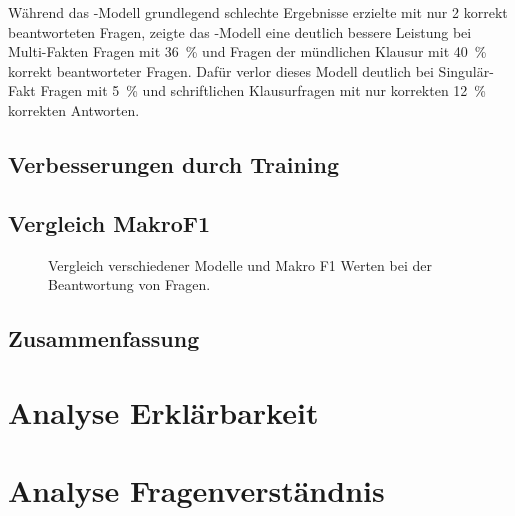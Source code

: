 Während das \liv-Modell grundlegend schlechte Ergebnisse erzielte mit nur 2 korrekt beantworteten Fragen, zeigte das \lia-Modell eine deutlich bessere Leistung bei Multi-Fakten Fragen mit \SI{36}{\percent} und Fragen der mündlichen Klausur mit \SI{40}{\percent} korrekt beantworteter Fragen. Dafür verlor dieses Modell deutlich bei Singulär-Fakt Fragen mit \SI{5}{\percent} und schriftlichen Klausurfragen mit nur korrekten \SI{12}{\percent} korrekten Antworten.\\



\subsection{Verbesserungen durch Training}
\subsection{Vergleich MakroF1}
\begin{figure}
    \caption{Vergleich verschiedener Modelle und Makro F1 Werten bei der Beantwortung von Fragen.}
    \label{fig:results:makro_total}
\end{figure}
\subsection{Zusammenfassung}
\section{Analyse Erklärbarkeit}\label{sec:results:explainability}
\section{Analyse Fragenverständnis}\label{sec:results:questionunderstanding}
